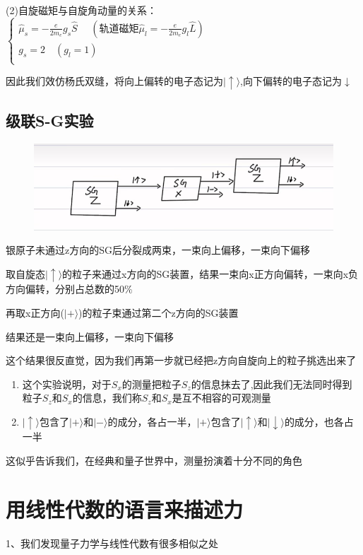\documentclass[lang=cn,15pt]{elegantbook}
\begin{document}
(2)自旋磁矩与自旋角动量的关系：
$\begin{cases}
	\widehat{\mu }_s=-\frac{e}{2m_e}g_s\hat{S}\,\,\quad \left( \text{轨道磁矩} \widehat{\mu }_l=-\frac{e}{2m_e}g_l\hat{L} \right)\\
	g_s=2\quad  \left( g_l=1 \right)\\
\end{cases}$

因此我们效仿杨氏双缝，将向上偏转的电子态记为$|\uparrow \rangle $,向下偏转的电子态记为$\downarrow$

\subsection{级联S-G实验}
\begin{figure}[H]
	\centering
	\includegraphics[width=0.7\linewidth]{figure/screenshot0016}
\end{figure}

银原子未通过z方向的SG后分裂成两束，一束向上偏移，一束向下偏移

取自旋态$|\uparrow \rangle $的粒子来通过x方向的SG装置，结果一束向x正方向偏转，一束向x负方向偏转，分别占总数的50$\%$

再取x正方向($|+ \rangle $)的粒子束通过第二个z方向的SG装置

结果还是一束向上偏移，一束向下偏移

这个结果很反直觉，因为我们再第一步就已经把z方向自旋向上的粒子挑选出来了

\begin{enumerate}
	\item  这个实验说明，对于$S_x$的测量把粒子$S_z$的信息抹去了,因此我们无法同时得到粒子$S_z$和$S_x$的信息，我们称$S_z$和$S_x$是互不相容的可观测量
	\item  $|\uparrow \rangle $包含了$|+ \rangle $和$|- \rangle $的成分，各占一半，$|+ \rangle $包含了$|\uparrow \rangle $和$|\downarrow \rangle $的成分，也各占一半
\end{enumerate}
这似乎告诉我们，在经典和量子世界中，测量扮演着十分不同的角色

\section{用线性代数的语言来描述力}
1、我们发现量子力学与线性代数有很多相似之处
\end{document}
